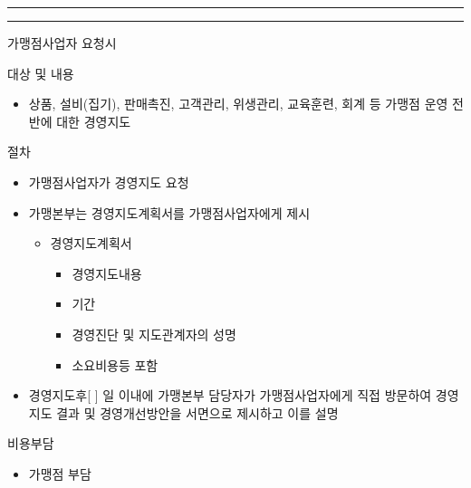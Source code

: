 \documentclass[a5paper,10pt]{oblivoir}
\newcommand\crule[3][black]{\textcolor{#1}{\rule{#2}{#3}}}
\begin{document}
\begin{enumerate}
\begin{tiny}
\begin{Form}
\end{Form}
\end{tiny}

\newpage
\begin{center}
\crule[red]{4cm}{0.1cm} \crule[blue]{4cm}{0.1cm}
\end{center}

\begin{tiny}
\begin{Form}
\def\LayoutCheckField#1#2{%
  \parbox[c][5mm]{5mm}{\centering\footnotesize\strut #1\\#2}%
}
\def\LayoutCheckField#1#2{%
  \makebox[0pt][l]{%
    \makebox[5mm][c]{\footnotesize\strut #1}%
  }%
  #2%
}
\def\DefaultHeightofCheckBox{5mm}
\def\DefaultWidthofCheckBox{5mm}

\rule{0cm}{.5cm}

 가맹점사업자 요청시

\noindent\dotfill 
 대상 및 내용

\begin{itemize}
\item 상품, 설비(집기), 판매촉진, 고객관리, 위생관리, 교육훈련, 회계 등 가맹점 운영 전반에 대한 경영지도
\end{itemize}

\noindent\dotfill 
 절차

\begin{itemize}
\item  가맹점사업자가 경영지도 요청
\item 가맹본부는 경영지도계획서를 가맹점사업자에게 제시
\begin{itemize}
\item 경영지도계획서
\begin{itemize}
\item 경영지도내용
\item 기간
\item 경영진단 및 지도관계자의 성명
\item 소요비용등 포함
\end{itemize}
\end{itemize}
\item 경영지도후[ ] 일 이내에 가맹본부 담당자가 가맹점사업자에게 직접 방문하여 경영지도 결과 및 경영개선방안을 서면으로 제시하고 이를 설명
\end{itemize}

\noindent\dotfill 
  비용부담

\begin{itemize}
\item 가맹점 부담
\end{itemize}


\end{Form}
\end{tiny}
\end{enumerate}
\end{document}
